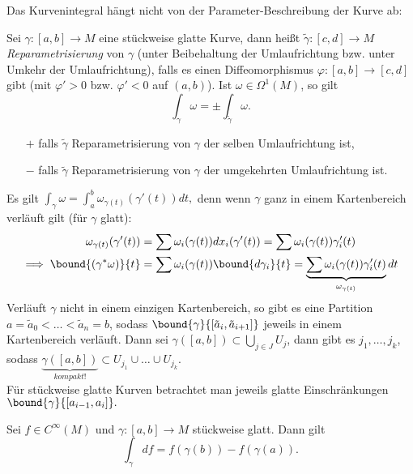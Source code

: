 Das Kurvenintegral hängt nicht von der Parameter-Beschreibung der Kurve ab:

\begin{lem}
	Sei $ \gamma: [a,b] \to M $ eine stückweise glatte Kurve, dann heißt $ \tilde{\gamma}: [c,d] \to M $ \emph{Reparametrisierung} von $\gamma$ (unter Beibehaltung der Umlaufrichtung bzw. unter Umkehr der Umlaufrichtung), falls es einen Diffeomorphismus $\varphi: [a,b] \to [c,d]$ gibt (mit $\varphi' > 0$ bzw. $\varphi' < 0$ auf $(a,b)$). Ist $\omega \in \Omega^1(M)$, so gilt
	\[ \int_\gamma \omega = \pm \int_{\tilde{\gamma}} \omega. \]
	\begin{itemize}
		\item[$+$] falls $\tilde{\gamma}$ Reparametrisierung von $\gamma$ der selben Umlaufrichtung ist,
		\item[$-$] falls $\tilde{\gamma}$ Reparametrisierung von $\gamma$ der umgekehrten Umlaufrichtung ist.
	\end{itemize}
\end{lem}

\begin{rem*}
	Es gilt $ \int_\gamma \omega = \int_a^b \omega_{\gamma(t)} (\gamma'(t))dt, $ denn wenn $\gamma$ ganz in einem Kartenbereich verläuft gilt (für $\gamma$ glatt):
	\begin{align*}
		\omega_{\gamma(t)} (\gamma'(t)) &= \sum \omega_i (\gamma(t)) dx_i (\gamma'(t))
			= \sum \omega_i(\gamma(t)) \gamma_i' (t)\\
		\implies \bound{(\gamma^*\omega)}{t} &= \sum \omega_i (\gamma(t)) \bound{d\gamma_i}{t}
			= \underbrace{\sum \omega_i (\gamma(t)) \gamma_i'(t)}_{\omega_{\gamma (t)}} dt
	\end{align*}
	Verläuft $\gamma$ nicht in einem einzigen Kartenbereich, so gibt es eine Partition $ a=\tilde{a}_0 < \dots < \tilde{a}_n = b $, sodass $ \bound{\gamma}{[\tilde{a}_i,\tilde{a}_{i+1}]} $ jeweils in einem Kartenbereich verläuft. Dann sei $ \gamma([a,b]) \subset \bigcup_{j \in J} U_j $, dann gibt es $ j_1,\dotsc,j_k$, sodass $ \underbrace{\gamma([a,b])}_{kompakt!} \subset U_{j_1} \cup \dots \cup U_{j_k}. $\\
	Für stückweise glatte Kurven betrachtet man jeweils glatte Einschränkungen $ \bound{\gamma}{[a_{i-1},a_i]}. $
\end{rem*}

\begin{thm}
	Sei $ f \in C^\infty(M) $ und $ \gamma:[a,b] \to M $ stückweise glatt. Dann gilt
	\[ \int_\gamma df = f(\gamma(b)) - f(\gamma(a)). \]
\end{thm}